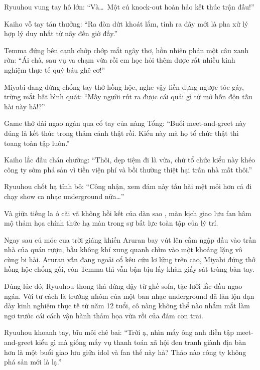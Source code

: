 \documentclass[../main.tex]{subfiles}
\begin{document}

Ryuuhou vung tay hô lớn: ``Và\dots\ Một cú knock-out hoàn hảo kết thúc trận đấu!''

Kaiho vỗ tay tán thưởng: ``Ra đòn dứt khoát lắm, tính ra đây mới là pha xử lý hợp lý duy nhất từ nãy đến giờ đấy.''

Temma đứng bên cạnh chớp chớp mắt ngây thơ, hồn nhiên phán một câu xanh rờn: ``Ái chà, sau vụ va chạm vừa rồi em học hỏi thêm được rất nhiều kinh nghiệm thực tế quý báu ghê cơ!''

Miyabi đang đứng chống tay thở hồng hộc, nghe vậy liền dựng ngược tóc gáy, trừng mắt bất bình quát: ``Mấy người rút ra được cái quái gì từ mớ hỗn độn tấu hài này hả!?''

Game thở dài ngao ngán qua cổ tay của nàng Tổng: ``Buổi meet-and-greet này đúng là kết thúc trong thảm cảnh thật rồi. Kiểu này mà họ tổ chức thật thì toang toàn tập luôn.''

Kaiho lắc đầu chán chường: ``Thôi, dẹp tiệm đi là vừa, chứ tổ chức kiểu này khéo công ty sớm phá sản vì tiền viện phí và bồi thường thiệt hại trần nhà mất thôi.''

Ryuuhou chốt hạ tỉnh bô: ``Công nhận, xem đám này tấu hài mệt mỏi hơn cả đi chạy show ca nhạc underground nữa\dots''

Và giữa tiếng la ó cãi vã không hồi kết của dàn sao \hls, màn kịch giao lưu fan hâm mộ thảm họa chính thức hạ màn trong sự bất lực toàn tập của lý trí.
\omk

Ngay sau cú móc cua trời giáng khiến Aruran bay vút lên cắm ngập đầu vào trần nhà của quán rượu, bầu không khí xung quanh chìm vào một khoảng lặng vô cùng bi hài. Aruran vẫn đang ngoải cổ kêu cứu lơ lửng trên cao, Miyabi đứng thở hồng hộc chống gối, còn Temma thì vẫn bận bịu lấy khăn giấy sát trùng bàn tay.

Đúng lúc đó,  Ryuuhou thong thả đứng dậy từ ghế sofa, tặc lưỡi lắc đầu ngao ngán. Với tư cách là trưởng nhóm của một ban nhạc underground đã lăn lộn dạn dày kinh nghiệm thực tế từ năm 12 tuổi, cô nàng không thể nào nhắm mắt làm ngơ trước cái cách vận hành thảm họa vừa rồi của đám con trai.

Ryuuhou khoanh tay, bĩu môi chê bai: ``Trời ạ, nhìn mấy ông anh diễn tập meet-and-greet kiểu gì mà giống mấy vụ thanh toán xã hội đen tranh giành địa bàn hơn là một buổi giao lưu giữa idol và fan thế này hả? Thảo nào công ty không phá sản mới là lạ.''
\end{document}
